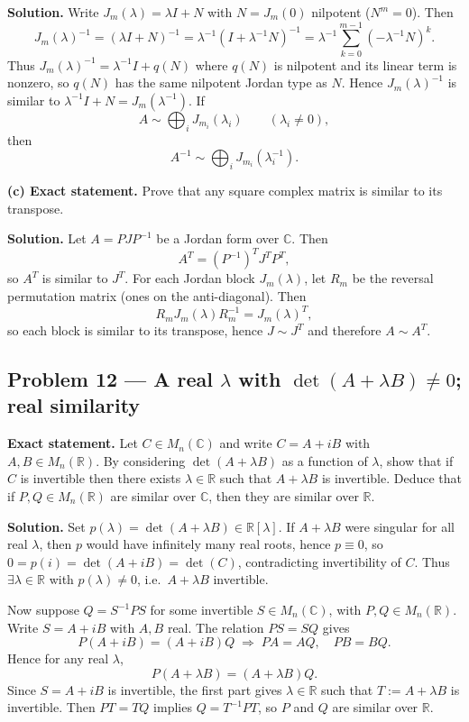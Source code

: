 \documentclass[12pt,a4paper]{article}
\theoremstyle{plain}
\theoremstyle{definition}      %
\begin{document}
\textbf{Solution.}
Write $J_m(\lambda)=\lambda I+N$ with $N=J_m(0)$ nilpotent ($N^m=0$). Then
\[
J_m(\lambda)^{-1}
=(\lambda I+N)^{-1}
=\lambda^{-1}(I+\lambda^{-1}N)^{-1}
=\lambda^{-1}\sum_{k=0}^{m-1}(-\lambda^{-1}N)^k.
\]
Thus $J_m(\lambda)^{-1}=\lambda^{-1}I+q(N)$ where $q(N)$ is nilpotent and its linear term is nonzero, so $q(N)$ has the same nilpotent Jordan type as $N$.
Hence $J_m(\lambda)^{-1}$ is similar to $\lambda^{-1}I+N=J_m(\lambda^{-1})$.
If
\[
A\sim \bigoplus_i J_{m_i}(\lambda_i)\qquad(\lambda_i\neq 0),
\]
then
\[
A^{-1}\sim \bigoplus_i J_{m_i}(\lambda_i^{-1}).
\]

\medskip
\textbf{(c) Exact statement.}
Prove that any square complex matrix is similar to its transpose.

\textbf{Solution.}
Let $A=PJP^{-1}$ be a Jordan form over $\mathbb C$. Then
\[
A^T=(P^{-1})^T J^T P^T,
\]
so $A^T$ is similar to $J^T$. For each Jordan block $J_m(\lambda)$, let $R_m$ be the reversal permutation matrix (ones on the anti-diagonal). Then
\[
R_m J_m(\lambda) R_m^{-1}=J_m(\lambda)^T,
\]
so each block is similar to its transpose, hence $J\sim J^T$ and therefore $A\sim A^T$.

\subsection*{Problem 12 — A real $\lambda$ with $\det(A+\lambda B)\neq 0$; real similarity}

\textbf{Exact statement.}
Let $C\in M_n(\mathbb C)$ and write $C=A+iB$ with $A,B\in M_n(\mathbb R)$.
By considering $\det(A+\lambda B)$ as a function of $\lambda$, show that if $C$ is invertible then there exists $\lambda\in\mathbb R$ such that $A+\lambda B$ is invertible.
Deduce that if $P,Q\in M_n(\mathbb R)$ are similar over $\mathbb C$, then they are similar over $\mathbb R$.

\textbf{Solution.}
Set $p(\lambda)=\det(A+\lambda B)\in\mathbb R[\lambda]$. If $A+\lambda B$ were singular for all real $\lambda$, then $p$ would have infinitely many real roots, hence $p\equiv 0$, so $0=p(i)=\det(A+iB)=\det(C)$, contradicting invertibility of $C$.
Thus $\exists \lambda\in\mathbb R$ with $p(\lambda)\neq 0$, i.e.\ $A+\lambda B$ invertible.

Now suppose $Q=S^{-1}PS$ for some invertible $S\in M_n(\mathbb C)$, with $P,Q\in M_n(\mathbb R)$.
Write $S=A+iB$ with $A,B$ real. The relation $PS=SQ$ gives
\[
P(A+iB)=(A+iB)Q \;\Rightarrow\; PA=AQ,\quad PB=BQ.
\]
Hence for any real $\lambda$,
\[
P(A+\lambda B)=(A+\lambda B)Q.
\]
Since $S=A+iB$ is invertible, the first part gives $\lambda\in\mathbb R$ such that $T:=A+\lambda B$ is invertible.
Then $PT=TQ$ implies $Q=T^{-1}PT$, so $P$ and $Q$ are similar over $\mathbb R$.
\end{document}
